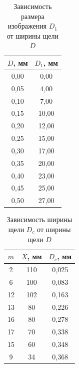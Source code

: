 \documentclass[a4paper]{article}
\begin{document}
\begin{table}[h!]
    \centering
    \caption{Зависимость размера изображения $D_1$ от ширины щели $D$}
    \begin{tabular}{|c|c|}
    \hline
    $D$, мм & $D_1$, мм \\ \hline
    0,00    & 0,00      \\ \hline
    0,05    & 4,00      \\ \hline
    0,10    & 7,00      \\ \hline
    0,15    & 10,00     \\ \hline
    0,20    & 12,00     \\ \hline
    0,25    & 15,00     \\ \hline
    0,30    & 17,00     \\ \hline
    0,35    & 20,00     \\ \hline
    0,40    & 23,00     \\ \hline
    0,45    & 25,00     \\ \hline
    0,50    & 27,00     \\ \hline
    \end{tabular}
    \end{table}

\newpage

    \begin{table}[h!]
        \centering
        \caption{Зависимость ширины щели $D_c$ от ширины щели $D$}
        \begin{tabular}{|c|c|c|}
        \hline
        $m$ & $X$, мм & $D_c$, мм \\ \hline
        2   & 110     & 0,025     \\ \hline
        6   & 100     & 0,083     \\ \hline
        12  & 102     & 0,163     \\ \hline
        13  & 80      & 0,226     \\ \hline
        16  & 80      & 0,278     \\ \hline
        17  & 70      & 0,338     \\ \hline
        15  & 60      & 0,348     \\ \hline
        9   & 34      & 0,368     \\ \hline
        \end{tabular}
        \end{table}
\end{document}
